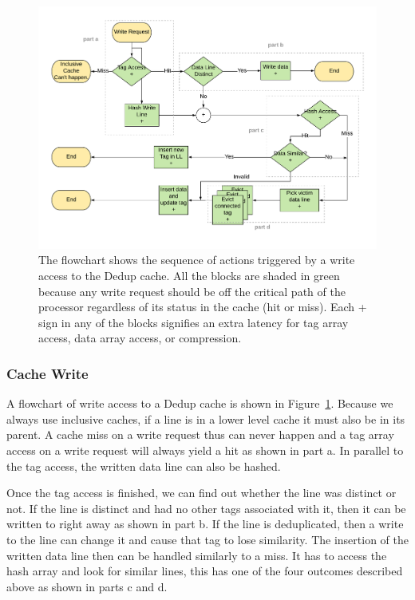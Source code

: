 \begin{figure}[h]
    \includegraphics[width=\textwidth]{Dedup_Write.pdf}
    \caption[Dedup Write]{The flowchart shows the sequence of actions triggered by a write access to the Dedup cache. All the blocks are shaded in green because any write request should be off the critical path of the processor regardless of its status in the cache (hit or miss). Each + sign in any of the blocks signifies an extra latency for tag array access, data array access, or compression.}
    \label{fig:Dedup_Write}
\end{figure}
\subsubsection{Cache Write}
A flowchart of write access to a Dedup cache is shown in Figure~\ref{fig:Dedup_Write}. Because we always use inclusive caches, if a line is in a lower level cache it must also be in its parent. A cache miss on a write request thus can never happen and a tag array access on a write request will always yield a hit as shown in part a. In parallel to the tag access, the written data line can also be hashed.\par
Once the tag access is finished, we can find out whether the line was distinct or not. If the line is distinct and had no other tags associated with it, then it can be written to right away as shown in part b. If the line is deduplicated, then a write to the line can change it and cause that tag to lose similarity. The insertion of the written data line then can be handled similarly to a miss. It has to access the hash array and look for similar lines, this has one of the four outcomes described above as shown in parts c and d.

